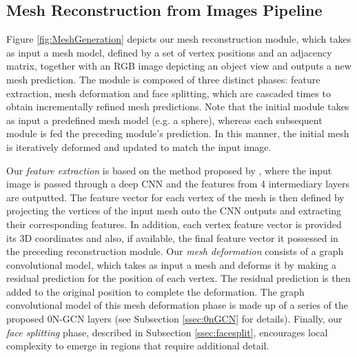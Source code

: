 \documentclass{article}
\begin{document}
\subsection{Mesh Reconstruction from Images Pipeline} 

Figure \ref{fig:MeshGeneration} depicts our mesh reconstruction module, which takes as input a mesh model, defined by a set of vertex positions and an adjacency matrix, together with an RGB image depicting an object view and outputs a new mesh prediction. The module is composed of three distinct phases: feature extraction, mesh deformation and face splitting, which are cascaded  times to obtain incrementally refined mesh predictions. Note that the initial module takes as input a predefined mesh model (e.g. a sphere), whereas each subsequent module is fed the preceding module's prediction. In this manner, the initial mesh is iteratively deformed and updated to match the input image.

Our \emph{feature extraction} is based on the method proposed by \citet{Pixel2Mesh}, where the input image is passed through a deep CNN and the features from 4 intermediary layers are outputted. The feature vector for each vertex of the mesh is then defined by projecting the vertices of the input mesh onto the CNN outputs and extracting their corresponding features. In addition, each vertex feature vector is provided its 3D coordinates  and also, if available, the final feature vector it possessed in the preceding reconstruction module.
Our \emph{mesh deformation} consists of a graph convolutional model, which takes as input a mesh and deforms it by making a residual prediction for the position of each vertex. The residual prediction is then added to the original position to complete the deformation. The graph convolutional model of this mesh deformation phase is made up of a series of the proposed 0N-GCN layers (see Subsection \ref{ssec:0nGCN} for details). Finally, our \emph{face splitting} phase, described in Subsection \ref{ssec:facesplit}, encourages local complexity to emerge in regions that require additional detail.
\end{document}
